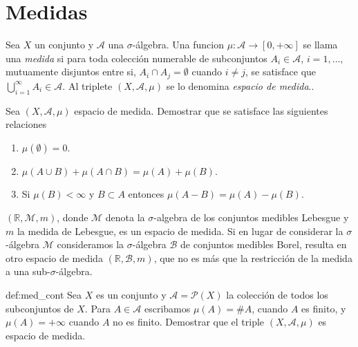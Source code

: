 \section{Medidas} 

\begin{definicion}{} Sea $X$ un conjunto y $\mathscr{A}$ una $\sigma$-álgebra. Una funcion $\mu:\mathscr{A}\to [0,+\infty]$ se llama una \emph{medida} si  para toda colección numerable de subconjuntos $A_i\in\mathscr{A}$, $i=1,\ldots$, mutuamente disjuntos entre si, $A_i\cap A_j=\emptyset$ cuando $i\neq j$, se satisface que $\bigcup_{i=1}^{\infty}A_i\in\mathscr{A}$. Al triplete $(X,\mathscr{A},\mu)$ se lo denomina \emph{espacio de medida}.. 
\end{definicion}


\begin{ejercicio}{}  Sea $(X,\mathscr{A},\mu)$ espacio de medida. Demostrar que se satisface las siguientes relaciones
\begin{enumerate}
 \item $\mu(\emptyset)=0$.
 \item $\mu(A\cup B)+\mu(A\cap B)=\mu(A)+\mu(B)$.
 \item Si $\mu(B)<\infty$ y $B\subset A$ entonces $\mu(A-B)=\mu(A)-\mu(B)$. 
\end{enumerate}

 
\end{ejercicio}

\begin{ejemplo}{} $(\mathbb{R},\mathscr{M},m)$, donde $\mathscr{M}$ denota la $\sigma$-algebra de los conjuntos medibles Lebesgue y $m$ la medida de Lebesgue, es un espacio de medida. Si en lugar de considerar la $\sigma$-álgebra $\mathscr{M}$ consideramos la $\sigma$-álgebra $\mathscr{B}$ de conjuntos medibles Borel, resulta en otro espacio de medida $(\mathbb{R},\mathscr{B},m)$, que no es más que la restricción de la medida a una sub-$\sigma$-álgebra.
 
\end{ejemplo}


\begin{ejercicio}{def:med_cont} Sea $X$ es un conjunto y $\mathscr{A}=\mathcal{P}(X)$ la colección de todos los subconjuntos de $X$. Para $A\in\mathscr{A}$ escribamos $\mu(A)=\#A$, cuando $A$ es finito, y $\mu(A)=+\infty$ cuando $A$ no es finito. Demostrar que el triple $(X,\mathscr{A},\mu)$ es espacio de medida.
 
\end{ejercicio}
 
